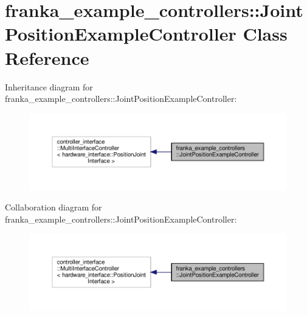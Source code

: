 \hypertarget{classfranka__example__controllers_1_1_joint_position_example_controller}{}\section{franka\+\_\+example\+\_\+controllers\+:\+:Joint\+Position\+Example\+Controller Class Reference}
\label{classfranka__example__controllers_1_1_joint_position_example_controller}


Inheritance diagram for franka\+\_\+example\+\_\+controllers\+:\+:Joint\+Position\+Example\+Controller\+:
\nopagebreak
\begin{figure}[H]
\begin{center}
\leavevmode
\includegraphics[width=350pt]{classfranka__example__controllers_1_1_joint_position_example_controller__inherit__graph}
\end{center}
\end{figure}


Collaboration diagram for franka\+\_\+example\+\_\+controllers\+:\+:Joint\+Position\+Example\+Controller\+:
\nopagebreak
\begin{figure}[H]
\begin{center}
\leavevmode
\includegraphics[width=350pt]{classfranka__example__controllers_1_1_joint_position_example_controller__coll__graph}
\end{center}
\end{figure}
